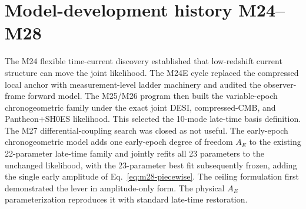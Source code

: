 \section{Model-development history M24--M28}
\label{sec:history}

The M24 flexible time-current discovery established that low-redshift
current structure can move the joint likelihood. The M24E cycle
replaced the compressed local anchor with measurement-level ladder
machinery and audited the observer-frame forward model. The M25/M26
program then built the variable-epoch chronogeometric family under the
exact joint DESI, compressed-CMB, and Pantheon+SH0ES likelihood. This
selected the 10-mode late-time basis definition. The M27 differential-coupling
search was closed as not useful. The early-epoch chronogeometric model
adds one early-epoch degree of freedom $A_{E}$ to the existing
22-parameter late-time family and jointly refits all 23 parameters to
the unchanged likelihood, with the 23-parameter best fit subsequently
frozen, adding the single early amplitude of Eq.~\eqref{eq:m28-piecewise}. The ceiling
formulation first demonstrated the lever in amplitude-only form. The
physical $A_{E}$ parameterization reproduces it with standard
late-time restoration.
